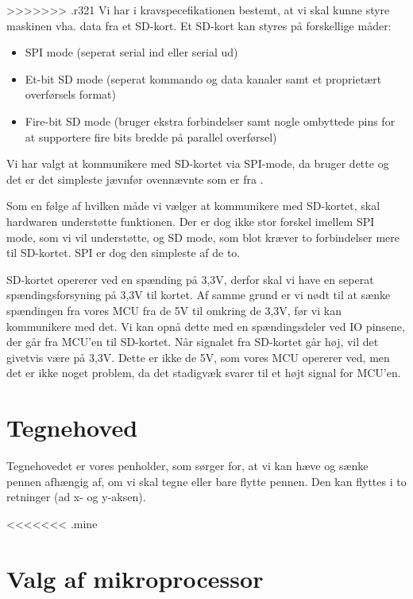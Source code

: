 >>>>>>> .r321
Vi har i kravspecefikationen bestemt, at vi skal kunne styre maskinen
vha. data fra et SD-kort. Et SD-kort kan styres på forskellige måder:

\begin{itemize} \firmlist
\item{SPI mode (seperat serial ind eller serial ud)}
\item{Et-bit SD mode (seperat kommando og data kanaler samt et
    proprietært overførsels format)}
\item{Fire-bit SD mode (bruger ekstra forbindelser samt nogle
    ombyttede pins for at supportere fire bits bredde på parallel
    overførsel)}
\end{itemize}

Vi har valgt at kommunikere med SD-kortet via SPI-mode, da
\cite{web:captain-mmc} bruger dette og det er det simpleste jævnfør
ovennævnte som er fra \cite{web:sd-pinout}.

Som en følge af hvilken måde vi vælger at kommunikere med SD-kortet,
skal hardwaren understøtte funktionen. Der er dog ikke stor forskel imellem
SPI mode, som vi vil understøtte, og SD mode, som blot kræver to
forbindelser mere til SD-kortet. SPI er dog den simpleste
af de to.

SD-kortet opererer ved en spænding på 3,3V, derfor skal vi have en
seperat spændingsforsyning på 3,3V til kortet. Af samme grund er vi
nødt til at sænke spændingen fra vores MCU fra de 5V til omkring de
3,3V, før vi kan kommunikere med det. Vi kan opnå dette med en
spændingsdeler ved IO pinsene, der går fra MCU'en til SD-kortet. Når
signalet fra SD-kortet går høj, vil det givetvis være på 3,3V. Dette
er ikke de 5V, som vores MCU opererer ved, men det er ikke noget
problem, da det stadigvæk svarer til et højt signal for MCU'en.


\section{Tegnehoved}
\label{sc:d-tegnehoved}
Tegnehovedet er vores penholder, som sørger for, at vi kan hæve og sænke
pennen afhængig af, om vi skal tegne eller bare flytte pennen. Den kan
flyttes i to retninger (ad x- og y-aksen).

<<<<<<< .mine

\section{Valg af mikroprocessor}
\label{sc:d-mikroprocessor}

